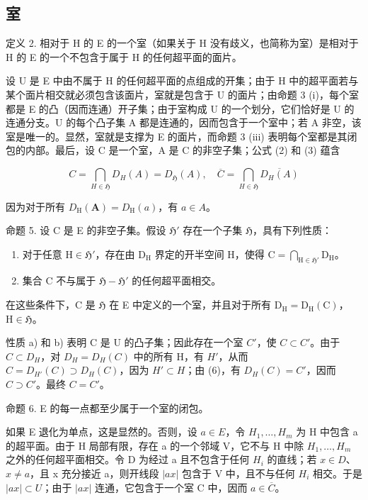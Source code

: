 \subsection{室}

定义 2. 相对于 H 的 E 的一个室（如果关于 H 没有歧义，也简称为室）是相对于 H 的 E 的一个不包含于属于 H 的任何超平面的面片。

设 U 是 E 中由不属于 H 的任何超平面的点组成的开集；由于 H 中的超平面若与某个面片相交就必须包含该面片，室就是包含于 U 的面片；由命题 3 (i)，每个室都是 E 的凸（因而连通）开子集；由于室构成 U 的一个划分，它们恰好是 U 的连通分支。U 的每个凸子集 A 都是连通的，因而包含于一个室中；若 A 非空，该室是唯一的。显然，室就是支撑为 E 的面片，而命题 3 (iii) 表明每个室都是其闭包的内部。最后，设 C 是一个室，A 是 C 的非空子集；公式 (2) 和 (3) 蕴含

\[
C = \bigcap_ {H \in \mathfrak {H}} D _ {H} (A) = D _ {\mathfrak {H}} (A), \quad \overline {{C}} = \bigcap_ {H \in \mathfrak {H}} \overline {{D _ {H} (A)}}\tag{6}
\]

因为对于所有 \(D_{\mathrm{H}}(\mathbf{A}) = D_{\mathrm{H}}(a)\)，有 \(a \in A\)。

命题 5. 设 C 是 E 的非空子集。假设 \(\mathfrak{H}'\) 存在一个子集 \(\mathfrak{H}\)，具有下列性质：

\begin{enumerate}
\def\labelenumi{\alph{enumi})}
\item
  对于任意 \(\mathrm{H} \in \mathfrak{H}'\)，存在由 \(\mathrm{D}_{\mathrm{H}}\) 界定的开半空间 \(\mathrm{H}\)，使得 \(\mathrm{C} = \bigcap_{\mathrm{H} \in \mathfrak{H}'} \mathrm{D}_{\mathrm{H}}\)。
\item
  集合 C 不与属于 \(\mathfrak{H} - \mathfrak{H}'\) 的任何超平面相交。
\end{enumerate}

在这些条件下，C 是 \(\mathfrak{H}\) 在 E 中定义的一个室，并且对于所有 \(\mathrm{D_H} = \mathrm{D_H(C)}\)，\(\mathrm{H} \in \mathfrak{H}\)。

性质 a) 和 b) 表明 C 是 U 的凸子集；因此存在一个室 \(C'\)，使 \(C \subset C'\)。由于 \(C \subset D_{H}\)，对 \(D_{H} = D_{H}(C)\) 中的所有 H，有 \(H'\)，从而 \(C = D_{H'}(C) \supset D_{H}(C)\)，因为 \(H' \subset H\)；由 (6)，有 \(D_{H}(C) = C'\)，因而 \(C \supset C'\)。最终 \(C = C'\)。

命题 6. E 的每一点都至少属于一个室的闭包。

如果 E 退化为单点，这是显然的。否则，设 \(a \in E\)，令 \(H_{1}, \ldots, H_{m}\) 为 H 中包含 a 的超平面。由于 H 局部有限，存在 a 的一个邻域 V，它不与 H 中除 \(H_{1}, \ldots, H_{m}\) 之外的任何超平面相交。令 D 为经过 a 且不包含于任何 \(H_{i}\) 的直线；若 \(x \in D\)、\(x \neq a\)，且 x 充分接近 a，则开线段 \(|ax|\) 包含于 V 中，且不与任何 \(H_{i}\) 相交。于是 \(|ax| \subset U\)；由于 \(|ax|\) 连通，它包含于一个室 C 中，因而 \(a \in \overline{C}\)。


